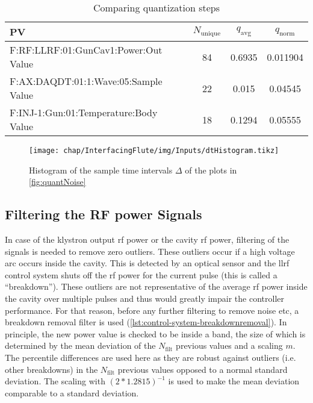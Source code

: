 \begin{table}[H]
\caption{Comparing quantization steps}\label{tab:interfacingFlute_quantSteps}
\centering
\begin{tabular}{lSSS}
\toprule
PV & {$N_\text{unique}$} & {$q_\text{avg}$} & {$q_\text{norm}$}\\
\midrule
F:RF:LLRF:01:GunCav1:Power:Out Value  & 84 & 0.6935 & 0.011904\\
F:AX:DAQDT:01:1:Wave:05:Sample Value  & 22 & 0.015  & 0.04545\\
F:INJ-1:Gun:01:Temperature:Body Value & 18 & 0.1294 & 0.05555\\
\bottomrule
\end{tabular}
\end{table}

\begin{figure}[H]
\centering
\texttt{[image: chap/InterfacingFlute/img/Inputs/dtHistogram.tikz]}
\caption[Histogram of EPICS CA sample times]{Histogram of the sample time intervals $\Delta$ of the plots in \autoref{fig:quantNoise}}
\label{fig:interfacingFlute_sampleTimesHist}
\end{figure}

\subsection{Filtering the RF power Signals}
In case of the klystron output \gls{rf} power or the cavity \gls{rf} power, filtering of the signals is needed to remove zero outliers.
These outliers occur if a high voltage arc occurs inside the cavity. This is detected by an optical sensor and the \gls{llrf} control system shuts off the \gls{rf} power for the current pulse (this is called a ``breakdown'').
These outliers are not representative of the average \gls{rf} power inside the cavity over multiple pulses and thus would greatly impair the controller performance.
For that reason, before any further filtering to remove noise etc, a breakdown removal filter is used (\autoref{lst:control-system-breakdownremoval}).
In principle, the new power value is checked to be inside a band, the size of which is determined by the mean deviation of the $N_\text{filt}$ previous values and a scaling $m$.
The percentile differences are used here as they are robust against outliers (i.e. other breakdowns) in the $N_\text{filt}$ previous values opposed to a normal standard deviation.
The scaling with $(2*1.2815)^{-1}$ is used to make the mean deviation comparable to a standard deviation.

